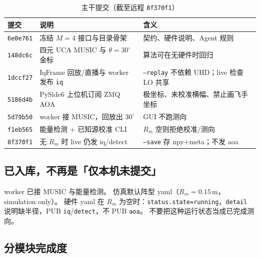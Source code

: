 \documentclass[UTF8,a4paper,12pt,zihao=-4]{ctexart}
\newcommand{\done}[1]{\textcolor{doneC}{#1}}
\newcommand{\upd}[1]{\textcolor{updC}{#1}}
\newcommand{\remind}[1]{\textcolor{remindC}{#1}}
\begin{document}
\begin{table}[htbp]
\centering
\caption{主干提交（截至远程 \texttt{8f370f1}）}
\begin{tabular}{@{}llp{6.6cm}@{}}
\toprule
提交 & 说明 & 含义 \\
\midrule
\texttt{6e0e761} & 冻结 $M=4$ 接口与目录骨架 & 契约、硬件说明、Agent 规则 \\
\texttt{148dc6c} & 四元 UCA MUSIC 与 $\theta=30^\circ$ 金标 & 算法可在无硬件时回归 \\
\texttt{1dccf27} & IqFrame 回放/直播与 worker 发布 \texttt{iq} & \texttt{--replay} 不依赖 UHD；live 检查 LO 共享 \\
\texttt{5186d4b} & PySide6 上位机订阅 ZMQ AOA & 极坐标、未校准横幅、禁止画飞手坐标 \\
\upd{\texttt{5d79b50}} & \upd{worker 接 MUSIC，回放出 $30^\circ$} & \upd{GUI 不跑测向} \\
\upd{\texttt{f1eb565}} & \upd{能量检测 + 已知源校准 CLI} & \upd{$R_m$ 空则拒绝校准/测向} \\
\upd{\texttt{8f370f1}} & \upd{无 $R_m$ 时 live 仍发 iq/detect} & \upd{\texttt{--save} 存 npy+meta；不发 aoa} \\
\bottomrule
\end{tabular}
\end{table}

\subsection{\done{已入库，不再是「仅本机未提交」}}

\done{worker 已接 MUSIC 与能量检测。}
仿真默认阵型 yaml（$R_m=0.15\,\mathrm{m}$，simulation only）。
\done{硬件 yaml 在 $R_m$ 为空时：\texttt{status.state=running}，\texttt{detail} 说明缺半径，PUB \texttt{iq}/\texttt{detect}，不 PUB \texttt{aoa}。}
\remind{不要把这种运行状态当成已完成测向。}

\subsection{分模块完成度}
\end{document}
